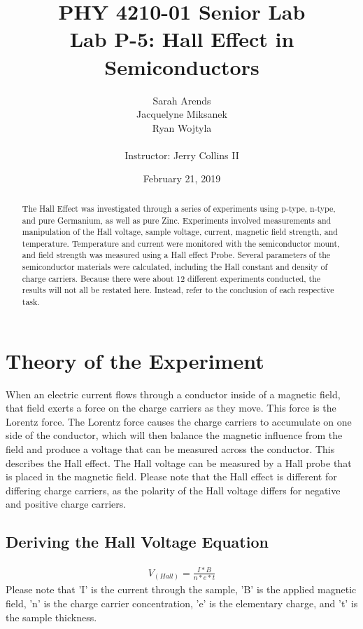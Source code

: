 \documentclass[a4paper]{article}
\title{PHY 4210-01 Senior Lab \\Lab P-5: Hall Effect in Semiconductors}
\author{Sarah Arends \\
        Jacquelyne Miksanek \\
        Ryan Wojtyla \\ \\
        Instructor: Jerry Collins II}
\date{February 21, 2019}
\begin{document}
\maketitle

\begin{abstract}
\qq The Hall Effect was investigated through a series of experiments
using p-type, n-type, and pure Germanium, as well as pure
Zinc. Experiments involved measurements and manipulation of the Hall
voltage, sample voltage, current, magnetic field strength, and
temperature. Temperature and current were monitored with the
semiconductor mount, and field strength was measured using a Hall
effect Probe. Several parameters of the semiconductor materials were
calculated, including the Hall constant and density of charge
carriers. Because there were about 12 different experiments conducted,
the results will not all be restated here. Instead, refer to the
conclusion of each respective task.
\end{abstract}

\newpage

\setcounter{tocdepth}{2}
\tableofcontents

\newpage

\section{Theory of the Experiment}

\qq When an electric current flows through a conductor inside of a
magnetic field, that field exerts a force on the charge carriers as
they move. This force is the Lorentz force. The Lorentz force causes
the charge carriers to accumulate on one side of the conductor, which
will then balance the magnetic influence from the field and produce a
voltage that can be measured across the conductor. This describes the
Hall effect. The Hall voltage can be measured by a Hall probe that is
placed in the magnetic field. Please note that the Hall effect is
different for differing charge carriers, as the polarity of the Hall
voltage differs for negative and positive charge carriers.

\subsection{Deriving the Hall Voltage Equation}

\begin{align*}
V_(Hall) = \frac{I*B}{n*e*t}
\end{align*}
\qq  Please note that 'I' is the current through the sample, 'B' is the
 applied magnetic field, 'n' is the charge carrier concentration, 'e'
 is the elementary charge, and 't' is the sample thickness.
\end{document}
